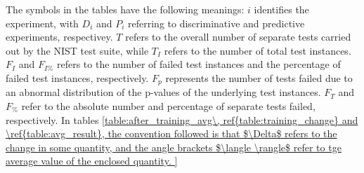 \documentclass[12pt, titlepage]{report}
\theoremstyle{definition}
\begin{document}
The symbols in the tables have the following meanings: $i$ identifies the experiment, with $D_i$ and $P_i$ referring to discriminative and predictive experiments, respectivey. $T$ refers to the overall number of separate tests carried out by the NIST test suite, while $T_I$ refers to the number of total test instances. $F_I$ and $F_{I\%}$ refers to the number of failed test instances and the percentage of failed test instances, respectively. $F_p$ represents the number of tests failed due to an abnormal distribution of the p-values of the underlying test instances. $F_T$ and $F_{\%}$ refer to the absolute number and percentage of separate tests failed, respectively. In tables \ref{table:after_training_avg\, ref{table:training_change} and \ref{table:avg_result}, the convention followed is that $\Delta$ refers to the change in some quantity, and the angle brackets $\langle \rangle$ refer to tge average value of the enclosed quantity.  

}
\end{document}
